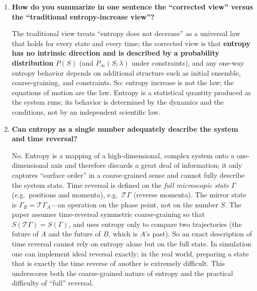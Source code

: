 \documentclass[11pt,a4paper]{article}
\begin{document}
\begin{enumerate}[leftmargin=*]
Entropy is not a physical law on a par with the equations of motion; it is a \emph{statistical quantity} that arises when the system evolves under those laws. The constituents follow the dynamical laws (e.g.\ Hamiltonian dynamics); entropy is a scalar function $S(\Gamma)$ of the trajectory under some coarse-graining, and its time dependence $S(t)=S(\Gamma(t))$ is entirely determined by the dynamics and the initial state. So the \emph{laws} are the equations of motion; how entropy changes is determined by those laws, not by a separate ``entropy-increase law'' that the system obeys. The traditional ``entropy monotonically increases'' formulation is an \emph{empirical and statistical summary} under the condition that systems start from low entropy and under specific constraints---not a universal scientific law.

\item \textbf{How do you summarize in one sentence the ``corrected view'' versus the ``traditional entropy-increase view''?}

The traditional view treats ``entropy does not decrease'' as a universal law that holds for every state and every time; the corrected view is that \textbf{entropy has no intrinsic direction and is described by a probability distribution} $P(S)$ (and $P_{\infty}(S;\lambda)$ under constraints), and any one-way entropy behavior depends on additional structure such as initial ensemble, coarse-graining, and constraints. So: entropy increase is not the law; the equations of motion are the law. Entropy is a statistical quantity produced as the system runs; its behavior is determined by the dynamics and the conditions, not by an independent scientific law.

\item \textbf{Can entropy as a single number adequately describe the system and time reversal?}

No. Entropy is a mapping of a high-dimensional, complex system onto a one-dimensional axis and therefore discards a great deal of information; it only captures ``surface order'' in a coarse-grained sense and cannot fully describe the system state. Time reversal is defined on the \emph{full microscopic state} $\Gamma$ (e.g.\ positions and momenta), e.g.\ $\mathcal{T}\Gamma$ (reverse momenta). The mirror state is $\Gamma_B = \mathcal{T}\Gamma_A$---an operation on the phase point, not on the number $S$. The paper assumes time-reversal symmetric coarse-graining so that $S(\mathcal{T}\Gamma)=S(\Gamma)$, and uses entropy only to compare two trajectories (the future of $A$ and the future of $B$, which is $A$'s past). So an exact description of time reversal cannot rely on entropy alone but on the full state. In simulation one can implement ideal reversal exactly; in the real world, preparing a state that is exactly the time reverse of another is extremely difficult. This underscores both the coarse-grained nature of entropy and the practical difficulty of ``full'' reversal.


\end{enumerate}
\end{document}
